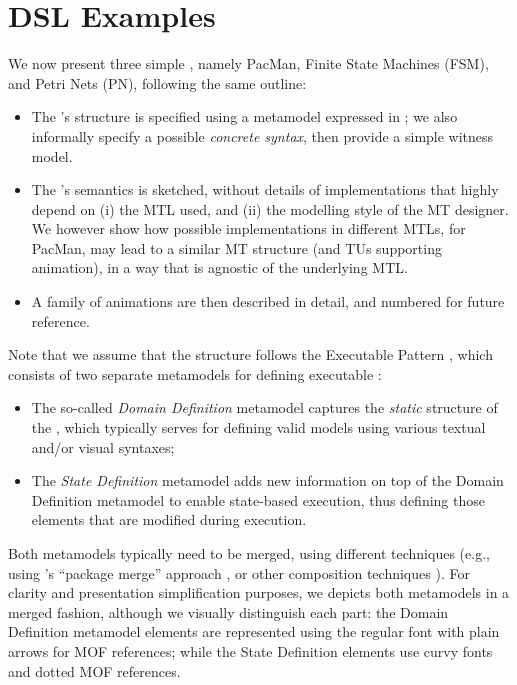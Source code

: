 \section{DSL Examples}
\label{sec:Examples}

We now present three simple \DSMLs, namely \textsf{PacMan}, Finite State
Machines (\textsf{FSM}), and Petri Nets (\textsf{PN}), following the same 
outline:
\begin{itemize}
	\item The \DSL's structure is specified using a metamodel expressed in \MOF;
   we also informally specify a possible \emph{concrete syntax}, then provide a 
   simple witness model.

   \item The \DSL's semantics is sketched, without details of implementations that
   highly depend on (i) the MTL used, and (ii) the modelling style of the MT designer. 
   We however show how possible implementations in different MTLs, for \textsf{PacMan},
   may lead to a similar MT structure (and TUs supporting animation), 
   in a way that is agnostic of the underlying MTL.

   \item A family of animations are then described in detail, and numbered for 
   future reference.
\end{itemize}
Note that we assume that the \DSL structure follows the Executable \DSML Pattern
\citep{Combemale-Cregut-Pantel:2012}, which consists of two separate metamodels for
defining executable \DSMLs:
\begin{itemize}
	\item The so-called \emph{Domain Definition} metamodel captures the 
   \emph{static} structure of the \DSL, which typically serves for defining valid
   models using various textual and/or visual syntaxes;
   
   \item The \emph{State Definition} metamodel adds new information on top of the
   Domain Definition metamodel to enable state-based execution, thus defining those
   elements that are modified during execution.
\end{itemize}
Both metamodels typically need to be merged, using different techniques (e.g.,
using \MOF's ``package merge'' approach \cite{TR:OMG-MOF:2016}, or other 
composition techniques \cite{J:Abouzahra-Sabraoui-Afdel:2020}).
For clarity and presentation simplification purposes, we depicts both metamodels
in a merged fashion, although we visually distinguish each part: the Domain Definition
metamodel elements are represented using the regular font with plain arrows for MOF 
references; while the State Definition elements use curvy fonts and dotted MOF references.








